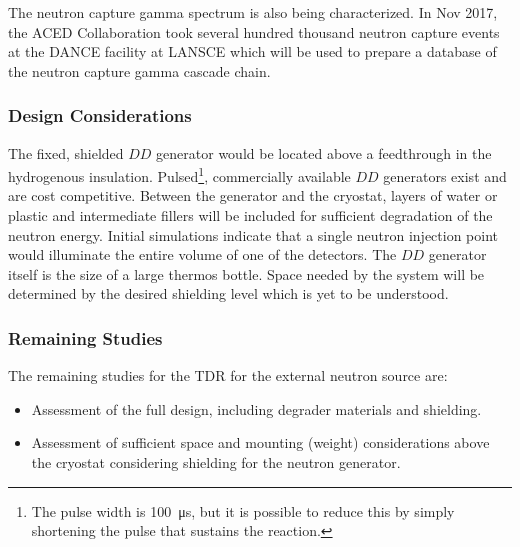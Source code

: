 The neutron capture gamma spectrum is also being characterized. In Nov 2017, the ACED Collaboration took several hundred thousand neutron capture events at the DANCE facility at LANSCE which will be used to prepare a database of the neutron capture gamma cascade chain.

\subsubsection{Design Considerations} 


The fixed, shielded $DD$ generator would be located above a feedthrough in the hydrogenous insulation. Pulsed\footnote{The pulse width is \SI{100}{\micro\s}, but it is possible to reduce this by simply shortening the  pulse that sustains the reaction.}, commercially available $DD$ generators exist and are cost competitive. Between the generator and the cryostat, layers of water or plastic and intermediate fillers will be included for sufficient degradation of the neutron energy. Initial simulations indicate that a single neutron injection point would illuminate %
the entire volume of one of the  detectors. The $DD$ generator itself is the size of a large thermos bottle. Space needed by the system will be determined by the desired shielding level which is yet to be understood.

\subsubsection{Remaining Studies}

The remaining studies for the TDR for the external neutron source are:
\begin{itemize}
\item Assessment of the full design, including degrader materials and shielding.
\item Assessment of sufficient space and mounting (weight) considerations above the cryostat considering shielding for the neutron generator. 
\end{itemize}


